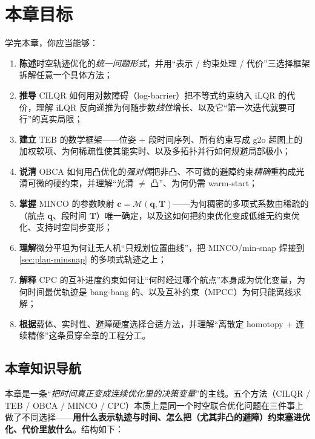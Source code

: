 \section*{本章目标}
学完本章，你应当能够：
\begin{enumerate}
  \item \textbf{陈述}时空轨迹优化的\emph{统一问题形式}，并用“表示 / 约束处理 / 代价”三选择框架拆解任意一个具体方法；
  \item \textbf{推导} CILQR 如何用对数障碍（log-barrier）把不等式约束纳入 iLQR 的代价，理解 iLQR 反向递推为何随步数\emph{线性}增长、以及它“第一次迭代就要可行”的真实局限；
  \item \textbf{建立} TEB 的数学框架——位姿 + 段时间序列、所有约束写成 g2o 超图上的加权软项、为何稀疏性使其能实时、以及多拓扑并行如何规避局部极小；
  \item \textbf{说清} OBCA 如何用凸优化的\emph{强对偶}把非凸、不可微的避障约束\emph{精确}重构成光滑可微的硬约束，并理解“光滑 $\ne$ 凸”、为何仍需 warm-start；
  \item \textbf{掌握} MINCO 的参数映射 $\mathbf c=\mathcal M(\mathbf q,\mathbf T)$——为何稠密的多项式系数由稀疏的（航点 $\mathbf q$、段时间 $\mathbf T$）唯一确定，以及这如何把约束优化变成低维无约束优化、支持时空同步变形；
  \item \textbf{理解}微分平坦为何让无人机“只规划位置曲线”，把 MINCO/min-snap 焊接到 \cref{sec:plan-minsnap} 的多项式轨迹之上；
  \item \textbf{解释} CPC 的互补进度约束如何让“何时经过哪个航点”本身成为优化变量，为何时间最优轨迹是 bang-bang 的、以及互补约束（MPCC）为何只能离线求解；
  \item \textbf{根据}载体、实时性、避障硬度选择合适方法，并理解“离散定 homotopy + 连续精修”这条贯穿全章的工程分工。
\end{enumerate}

\subsection*{本章知识导航}
本章是一条“\emph{把时间真正变成连续优化里的决策变量}”的主线。五个方法（CILQR / TEB / OBCA / MINCO / CPC）本质上是同一个时空联合优化问题在三件事上做了不同选择——\textbf{用什么表示轨迹与时间、怎么把（尤其非凸的避障）约束塞进优化、代价里放什么}。结构如下：

